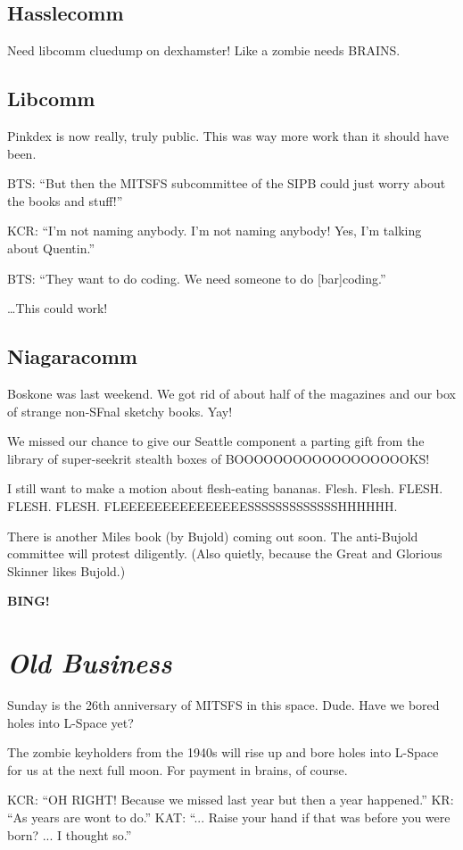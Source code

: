\documentclass[10pt]{article}
\newcommand{\bing}{{\bf BING!} }
\newcommand{\goto}[1]{\bing \vskip 12pt \section*{{\em{#1}}}}
\begin{document}
\subsection*{Hasslecomm}

Need libcomm cluedump on dexhamster!  Like a zombie needs BRAINS.

\subsection*{Libcomm}

Pinkdex is now really, truly public.  This was way more work than it should have been.

BTS: ``But then the MITSFS subcommittee of the SIPB could just worry about the books and stuff!''

KCR: ``I'm not naming anybody.  I'm not naming anybody!  Yes, I'm talking about Quentin.''

BTS: ``They want to do coding.  We need someone to do [bar]coding.''

\ldots This could work!

\subsection*{Niagaracomm}

Boskone was last weekend.  We got rid of about half of the magazines and our box of strange non-SFnal sketchy books.  Yay!

We missed our chance to give our Seattle component a parting gift from the library of super-seekrit stealth boxes of BOOOOOOOOOOOOOOOOOOKS!

I still want to make a motion about flesh-eating bananas.  Flesh.  Flesh.  FLESH.  FLESH.  FLESH.  FLEEEEEEEEEEEEEEESSSSSSSSSSSSSHHHHHH.

There is another Miles book (by Bujold) coming out soon.  The anti-Bujold committee will protest diligently.  (Also quietly, because the Great and Glorious Skinner likes Bujold.)

\goto{Old Business}

Sunday is the 26th anniversary of MITSFS in this space.  Dude.  Have we bored holes into L-Space yet?

The zombie keyholders from the 1940s will rise up and bore holes into L-Space for us at the next full moon.  For payment in brains, of course.

KCR: ``OH RIGHT!  Because we missed last year but then a year happened.''
KR: ``As years are wont to do.''
KAT: ``... Raise your hand if that was before you were born? ... I thought so.''
\end{document}
